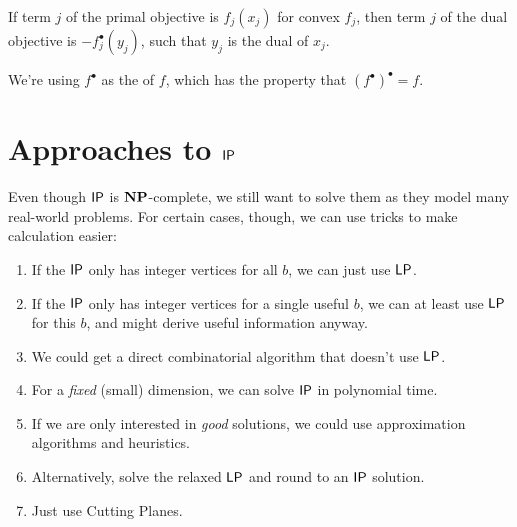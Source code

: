 \begin{fact}
    If term $j$ of the primal objective is $f_j(x_j)$ for convex $f_j$,
    then term $j$ of the dual objective is $-f_j^\bullet(y_j)$, such that
    $y_j$ is the dual of $x_j$.

    We're using $f^\bullet$ as the  of $f$, which has the property that
    $(f^\bullet)^\bullet=f$.
\end{fact}
\section{Approaches to $\mathsf{IP}$}
Even though $\mathsf{IP}$ is $\mathbf{NP}$-complete, we still want to solve them as they model many real-world problems.
For certain cases, though, we can use tricks to make calculation easier:
\begin{enumerate}
    \item If the $\mathsf{IP}$ only has integer vertices for all $b$, we can just use $\mathsf{LP}$.
    \item If the $\mathsf{IP}$ only has integer vertices for a single useful $b$, we can at least use $\mathsf{LP}$ for this $b$, and might derive useful information anyway.
    \item We could get a direct combinatorial algorithm that doesn't use $\mathsf{LP}$. 
    \item For a \emph{fixed} (small) dimension, we can solve $\mathsf{IP}$ in polynomial time.
    \item If we are only interested in \emph{good} solutions, we could use approximation algorithms and heuristics.
    \item Alternatively, solve the relaxed $\mathsf{LP}$ and round to an $\mathsf{IP}$ solution.
    \item Just use Cutting Planes.
\end{enumerate}
